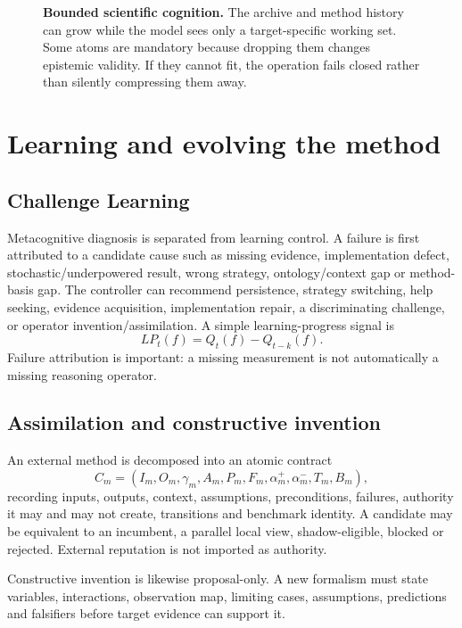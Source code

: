 \documentclass[11pt]{article}
\begin{document}
\begin{figure}[t]
\centering
\resizebox{0.94\textwidth}{!}{}
\caption{\textbf{Bounded scientific cognition.} The archive and method history can grow while the model sees only a target-specific working set. Some atoms are mandatory because dropping them changes epistemic validity. If they cannot fit, the operation fails closed rather than silently compressing them away.}
\label{fig:context}
\end{figure}

\section{Learning and evolving the method}
\subsection{Challenge Learning}
Metacognitive diagnosis is separated from learning control. A failure is first attributed to a candidate cause such as missing evidence, implementation defect, stochastic/underpowered result, wrong strategy, ontology/context gap or method-basis gap. The controller can recommend persistence, strategy switching, help seeking, evidence acquisition, implementation repair, a discriminating challenge, or operator invention/assimilation. A simple learning-progress signal is
\begin{equation}
LP_t(f)=Q_t(f)-Q_{t-k}(f).
\end{equation}
Failure attribution is important: a missing measurement is not automatically a missing reasoning operator.

\subsection{Assimilation and constructive invention}
An external method is decomposed into an atomic contract
\begin{equation}
C_m=(I_m,O_m,\gamma_m,A_m,P_m,F_m,\alpha_m^+,\alpha_m^-,T_m,B_m),
\end{equation}
recording inputs, outputs, context, assumptions, preconditions, failures, authority it may and may not create, transitions and benchmark identity. A candidate may be equivalent to an incumbent, a parallel local view, shadow-eligible, blocked or rejected. External reputation is not imported as authority.

Constructive invention is likewise proposal-only. A new formalism must state variables, interactions, observation map, limiting cases, assumptions, predictions and falsifiers before target evidence can support it.
\end{document}
